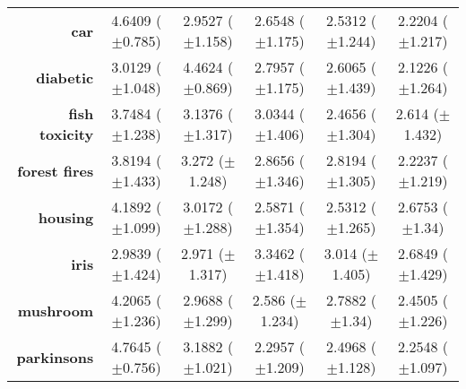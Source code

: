 \begin{table}[htb]
{\begin{tabular}{r|ccccc}
			\textbf{car}                 & \cellcolor[rgb]{ .973,  .412,  .42}4.6409 ($\pm$0.785)  & \cellcolor[rgb]{ .996,  .847,  .506}2.9527 ($\pm$1.158) & \cellcolor[rgb]{ 1,  .922,  .518}2.6548 ($\pm$1.175)    & \cellcolor[rgb]{ .824,  .871,  .506}2.5312 ($\pm$1.244) & \cellcolor[rgb]{ .388,  .745,  .482}2.2204 ($\pm$1.217) \\
			\textbf{diabetic}            & \cellcolor[rgb]{ 1,  .859,  .506}3.0129 ($\pm$1.048)    & \cellcolor[rgb]{ .973,  .412,  .42}4.4624 ($\pm$0.869)  & \cellcolor[rgb]{ 1,  .922,  .518}2.7957 ($\pm$1.175)    & \cellcolor[rgb]{ .827,  .871,  .506}2.6065 ($\pm$1.439) & \cellcolor[rgb]{ .388,  .745,  .482}2.1226 ($\pm$1.264) \\
			\textbf{fish toxicity}       & \cellcolor[rgb]{ .973,  .412,  .42}3.7484 ($\pm$1.238)  & \cellcolor[rgb]{ .996,  .851,  .506}3.1376 ($\pm$1.317) & \cellcolor[rgb]{ 1,  .922,  .518}3.0344 ($\pm$1.406)    & \cellcolor[rgb]{ .388,  .745,  .482}2.4656 ($\pm$1.304) & \cellcolor[rgb]{ .545,  .788,  .49}2.614 ($\pm$1.432)   \\
			\textbf{forest fires}        & \cellcolor[rgb]{ .973,  .412,  .42}3.8194 ($\pm$1.433)  & \cellcolor[rgb]{ .992,  .706,  .478}3.272 ($\pm$1.248)  & \cellcolor[rgb]{ 1,  .922,  .518}2.8656 ($\pm$1.346)    & \cellcolor[rgb]{ .953,  .906,  .514}2.8194 ($\pm$1.305) & \cellcolor[rgb]{ .388,  .745,  .482}2.2237 ($\pm$1.219) \\
			\textbf{housing}             & \cellcolor[rgb]{ .973,  .412,  .42}4.1892 ($\pm$1.099)  & \cellcolor[rgb]{ .996,  .808,  .498}3.0172 ($\pm$1.288) & \cellcolor[rgb]{ .624,  .812,  .494}2.5871 ($\pm$1.354) & \cellcolor[rgb]{ .388,  .745,  .482}2.5312 ($\pm$1.265) & \cellcolor[rgb]{ 1,  .922,  .518}2.6753 ($\pm$1.34)     \\
			\textbf{iris}                & \cellcolor[rgb]{ 1,  .922,  .518}2.9839 ($\pm$1.424)    & \cellcolor[rgb]{ .973,  .914,  .514}2.971 ($\pm$1.317)  & \cellcolor[rgb]{ .973,  .412,  .42}3.3462 ($\pm$1.418)  & \cellcolor[rgb]{ 1,  .882,  .51}3.014 ($\pm$1.405)      & \cellcolor[rgb]{ .388,  .745,  .482}2.6849 ($\pm$1.429) \\
			\textbf{mushroom}            & \cellcolor[rgb]{ .973,  .412,  .42}4.2065 ($\pm$1.236)  & \cellcolor[rgb]{ 1,  .859,  .506}2.9688 ($\pm$1.299)    & \cellcolor[rgb]{ .631,  .816,  .494}2.586 ($\pm$1.234)  & \cellcolor[rgb]{ 1,  .922,  .518}2.7882 ($\pm$1.34)     & \cellcolor[rgb]{ .388,  .745,  .482}2.4505 ($\pm$1.226) \\
			\textbf{parkinsons}          & \cellcolor[rgb]{ .973,  .412,  .42}4.7645 ($\pm$0.756)  & \cellcolor[rgb]{ .992,  .769,  .49}3.1882 ($\pm$1.021)  & \cellcolor[rgb]{ .49,  .773,  .486}2.2957 ($\pm$1.209)  & \cellcolor[rgb]{ 1,  .922,  .518}2.4968 ($\pm$1.128)    & \cellcolor[rgb]{ .388,  .745,  .482}2.2548 ($\pm$1.097) \\

\end{tabular}}
\end{table}
